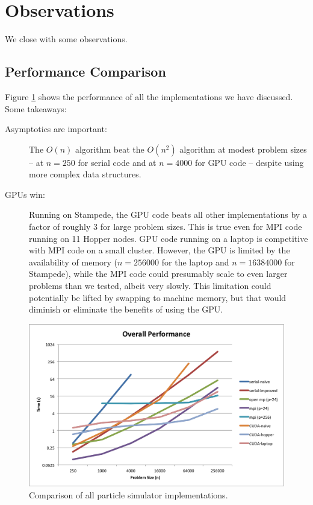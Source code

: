 \documentclass{article}
\begin{document}
\section{Observations}
We close with some observations.

\subsection{Performance Comparison}
Figure \ref{fig:all} shows the performance of all the implementations we have discussed.  Some takeaways:
\begin{description}
  \item[Asymptotics are important:] The $O(n)$ algorithm beat the $O(n^2)$ algorithm at modest problem sizes -- at $n=250$ for serial code and at $n=4000$ for GPU code -- despite using more complex data structures.
  \item[GPUs win:] Running on Stampede, the GPU code beats all other implementations by a factor of roughly 3 for large problem sizes.  This is true even for MPI code running on 11 Hopper nodes.  GPU code running on a laptop is competitive with MPI code on a small cluster.  However, the GPU is limited by the availability of memory ($n=256000$ for the laptop and $n=16384000$ for Stampede), while the MPI code could presumably scale to even larger problems than we tested, albeit very slowly.  This limitation could potentially be lifted by swapping to machine memory, but that would diminish or eliminate the benefits of using the GPU.
\end{description}

\begin{figure}
  \includegraphics[width=\textwidth]{plots/Overall.png}
  \caption{Comparison of all particle simulator implementations.}
  \label{fig:all}
\end{figure}
\end{document}
